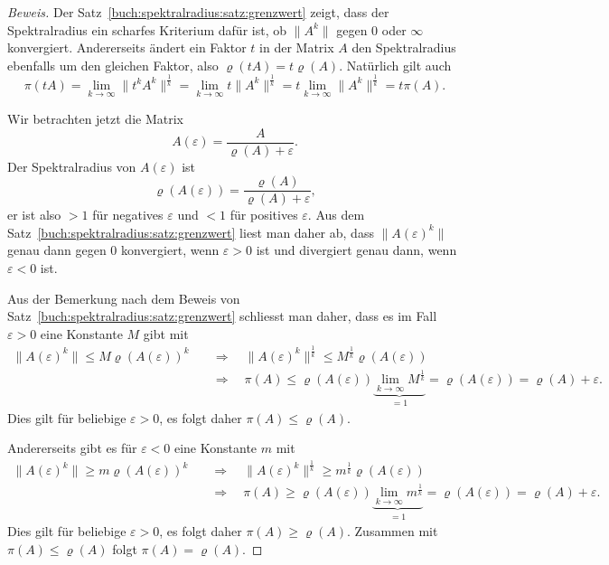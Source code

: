 \begin{proof}[Beweis]
Der Satz~\ref{buch:spektralradius:satz:grenzwert} zeigt, dass der
Spektralradius ein scharfes Kriterium dafür ist, ob $\|A^k\|$ 
gegen 0 oder $\infty$ konvergiert.
Andererseits ändert ein Faktor $t$ in der Matrix $A$ den Spektralradius
ebenfalls um den gleichen Faktor, also $\varrho(tA)=t\varrho(A)$.
Natürlich gilt auch
\[
\pi(tA)
=
\lim_{k\to\infty} \|t^kA^k\|^\frac1k
=
\lim_{k\to\infty} t\|A^k\|^\frac1k
=
t\lim_{k\to\infty} \|A^k\|^\frac1k
=
t\pi(A).
\]

Wir betrachten jetzt die Matrix
\[
A(\varepsilon) = \frac{A}{\varrho(A) + \varepsilon}.
\]
Der Spektralradius von $A(\varepsilon)$ ist
\[
\varrho(A(\varepsilon)) = \frac{\varrho(A)}{\varrho(A)+\varepsilon},
\]
er ist also $>1$ für negatives $\varepsilon$ und $<1$ für positives
$\varepsilon$.
Aus dem Satz~\ref{buch:spektralradius:satz:grenzwert} liest man daher ab,
dass $\|A(\varepsilon)^k\|$ genau dann gegen $0$ konvergiert, wenn
$\varepsilon > 0$ ist und divergiert genau dann, wenn $\varepsilon< 0$ ist.

Aus der Bemerkung nach dem Beweis von
Satz~\ref{buch:spektralradius:satz:grenzwert} schliesst man daher, dass 
es im Fall $\varepsilon > 0$ eine Konstante $M$ gibt mit
\begin{align*}
\|A(\varepsilon) ^k\|\le M\varrho(A(\varepsilon))^k
\quad&\Rightarrow\quad
\|A(\varepsilon) ^k\|^\frac1k\le M^\frac1k\varrho(A(\varepsilon))
\\
&\Rightarrow\quad
\pi(A) \le  \varrho(A(\varepsilon))
\underbrace{\lim_{k\to\infty} M^\frac1k}_{\displaystyle=1}
=
\varrho(A(\varepsilon))
=
\varrho(A)+\varepsilon.
\end{align*}
Dies gilt für beliebige $\varepsilon >0$, es folgt daher
$\pi(A) \le \varrho(A)$.

Andererseits gibt es für $\varepsilon <0$ eine Konstante $m$ mit
\begin{align*}
\|A(\varepsilon) ^k\|\ge m\varrho(A(\varepsilon))^k
\quad&\Rightarrow\quad
\|A(\varepsilon) ^k\|^\frac1k\ge m^\frac1k\varrho(A(\varepsilon))
\\
&\Rightarrow\quad
\pi(A) \ge  \varrho(A(\varepsilon))
\underbrace{\lim_{k\to\infty} m^\frac1k}_{\displaystyle=1}
=
\varrho(A(\varepsilon))
=
\varrho(A)+\varepsilon.
\end{align*}
Dies gilt für beliebige $\varepsilon> 0$, es folgt daher
$\pi(A) \ge \varrho(A)$.
Zusammen mit $\pi(A) \le \varrho(A)$ folgt $\pi(A)=\varrho(A)$.
\end{proof}

